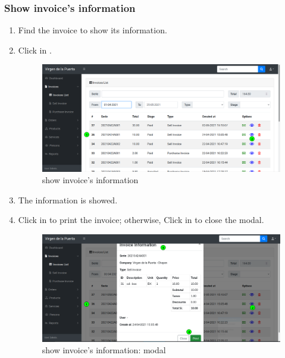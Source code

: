 \documentclass[a4paper,11pt]{refart}
\begin{document}
\subsubsection{Show invoice's information}
\begin{enumerate}
	\item Find the invoice to show its information.
	\item Click in .
	\begin{figure}[H]\centering
		\includegraphics[width=\textwidth]{images/invoice_list-show.png}
		\caption{show invoice's information}
		\label{fig:invoice_list-show}
	\end{figure}
	\item The information is showed.
	\item Click in  to print the invoice; otherwise, Click in  to close the modal.
	\begin{figure}[H]\centering
		\includegraphics[width=\textwidth]{images/invoice_list-show-modal.png}
			\caption{show invoice's information: modal}
		\label{fig:invoice_list-show-modal}
	\end{figure}
\end{enumerate}
\end{document}
